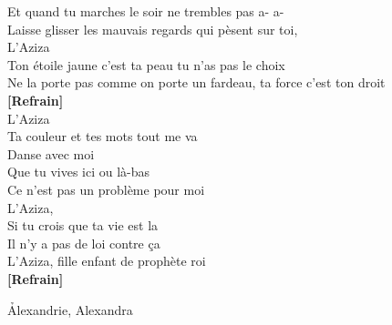 \documentclass{novel}
\begin{document}
Et quand tu marches le soir ne trembles pas a- a- \\
Laisse glisser les mauvais regards qui pèsent sur toi, \\
L'Aziza \\
Ton étoile jaune c'est ta peau tu n'as pas le choix \\
Ne la porte pas comme on porte un fardeau, ta force c'est ton droit \\

\textbf{[Refrain]} \\

L’Aziza \\
Ta couleur et tes mots tout me va \\
Danse avec moi \\
Que tu vives ici ou là-bas \\
Ce n'est pas un problème pour moi \\
L'Aziza, \\
Si tu crois que ta vie est la \\
Il n'y a pas de loi contre ça \\
L'Aziza, fille enfant de prophète roi \\

\textbf{[Refrain]}

\newpage
\normalsize

\h*{Alexandrie, Alexandra}
\end{document}
